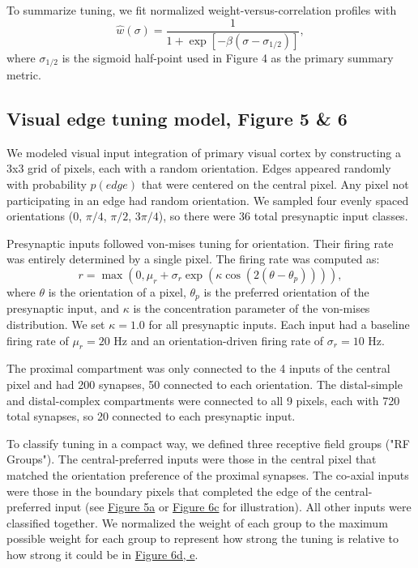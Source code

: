 To summarize tuning, we fit normalized weight-versus-correlation profiles with
\begin{equation*}
\hat w(\sigma)=\frac{1}{1+\exp\!\left[-\beta(\sigma-\sigma_{1/2})\right]},
\end{equation*}
where $\sigma_{1/2}$ is the sigmoid half-point used in Figure 4 as the primary summary metric.

\subsection*{Visual edge tuning model, Figure 5 \& 6}
We modeled visual input integration of primary visual cortex by constructing a 3x3 grid of pixels, each with a random orientation. Edges appeared randomly with probability $p(edge)$ that were centered on the central pixel. Any pixel not participating in an edge had random orientation. We sampled four evenly spaced orientations ($0$, $\pi/4$, $\pi/2$, $3\pi/4$), so there were 36 total presynaptic input classes. 

Presynaptic inputs followed von-mises tuning for orientation. Their firing rate was entirely determined by a single pixel. The firing rate was computed as: 
\begin{equation*}
r = \max\!\left(0,\mu_r+\sigma_r \exp\!\left(\kappa \cos(2(\theta - \theta_p))\right)\right),
\end{equation*}
where $\theta$ is the orientation of a pixel, $\theta_p$ is the preferred orientation of the presynaptic input, and $\kappa$ is the concentration parameter of the von-mises distribution. We set $\kappa=1.0$ for all presynaptic inputs. Each input had a baseline firing rate of $\mu_r=20$ Hz and an orientation-driven firing rate of $\sigma_r=10$ Hz.

The proximal compartment was only connected to the 4 inputs of the central pixel and had 200 synapses, 50 connected to each orientation. The distal-simple and distal-complex compartments were connected to all 9 pixels, each with 720 total synapses, so 20 connected to each presynaptic input.

To classify tuning in a compact way, we defined three receptive field groups ("RF Groups"). The central-preferred inputs were those in the central pixel that matched the orientation preference of the proximal synapses. The co-axial inputs were those in the boundary pixels that completed the edge of the central-preferred input (see \hyperref[fig:5]{Figure 5a} or \hyperref[fig:6]{Figure 6c} for illustration). All other inputs were classified together. We normalized the weight of each group to the maximum possible weight for each group to represent how strong the tuning is relative to how strong it could be in \hyperref[fig:6]{Figure 6d, e}. 

